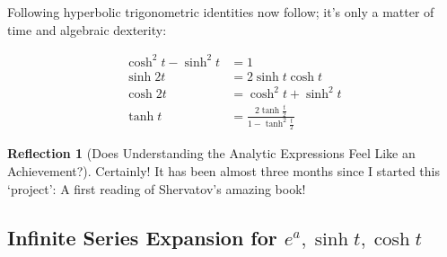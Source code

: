 \documentclass[11pt]{article}
\theoremstyle{definition}
\theoremstyle{plain}
\theoremstyle{problemstyle}
\theoremstyle{remark}
\theoremstyle{definition}
\newtheorem{reflection}{Reflection}
\begin{document}
Following hyperbolic trigonometric identities now follow; it's only a matter of time and algebraic dexterity:

\begin{equation}
\label{eq:other-hyperbolic-identities}
    \begin{aligned}
        \cosh^2{t}-\sinh^2{t} &= 1\\
                    \sinh{2t} &= 2\sinh{t}\cosh{t}\\
                    \cosh{2t} &= \cosh^2{t}+\sinh^2{t}\\
                    \tanh{t}  &= \frac{2\tanh{\frac{t}{2}}}{1-\tanh^2{\frac{t}{2}}}
    \end{aligned}
\end{equation}


\begin{reflection}[Does Understanding the Analytic Expressions Feel Like an Achievement?]
    Certainly! It has been almost three months since I started this `project': A first reading of Shervatov's amazing book!
\end{reflection}

\subsection{Infinite Series Expansion for $e^a,\sinh{t},\cosh{t}$}
\end{document}
